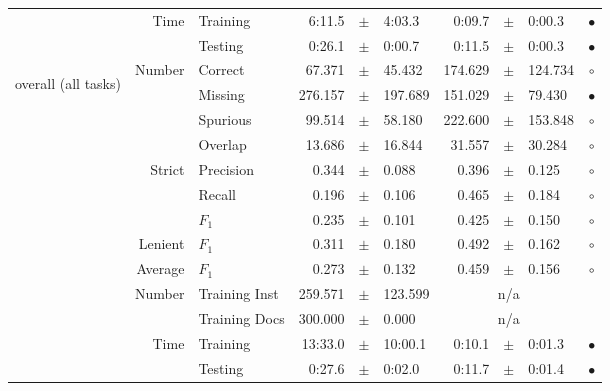 \begin{longtable}{|r|r|l||rcl|rcl|c|}
\cline{2-10} & \multirow{2}{*}{      Time} &        Training &      6:11.5 &  $\pm$  &      4:03.3 &      0:09.7 &  $\pm$  &      0:00.3 & $\bullet$ \\
\cline{3-10} &                             &         Testing &      0:26.1 &  $\pm$  &      0:00.7 &      0:11.5 &  $\pm$  &      0:00.3 & $\bullet$ \\
\hline
\hline
\multirow{11}{*}{\begin{sideways}overall (all tasks)\end{sideways} }
             & \multirow{4}{*}{    Number} &         Correct &      67.371 &  $\pm$  &      45.432 &     174.629 &  $\pm$  &     124.734 & $\circ$ \\
\cline{3-10} &                             &         Missing &     276.157 &  $\pm$  &     197.689 &     151.029 &  $\pm$  &      79.430 & $\bullet$ \\
\cline{3-10} &                             &        Spurious &      99.514 &  $\pm$  &      58.180 &     222.600 &  $\pm$  &     153.848 & $\circ$ \\
\cline{3-10} &                             &         Overlap &      13.686 &  $\pm$  &      16.844 &      31.557 &  $\pm$  &      30.284 & $\circ$ \\
\cline{2-10} & \multirow{3}{*}{    Strict} &       Precision &       0.344 &  $\pm$  &       0.088 &       0.396 &  $\pm$  &       0.125 & $\circ$ \\
\cline{3-10} &                             &          Recall &       0.196 &  $\pm$  &       0.106 &       0.465 &  $\pm$  &       0.184 & $\circ$ \\
\cline{3-10} &                             &           $F_1$ &       0.235 &  $\pm$  &       0.101 &       0.425 &  $\pm$  &       0.150 & $\circ$ \\
\cline{2-10} &                     Lenient &           $F_1$ &       0.311 &  $\pm$  &       0.180 &       0.492 &  $\pm$  &       0.162 & $\circ$ \\
\cline{2-10} &                     Average &           $F_1$ &       0.273 &  $\pm$  &       0.132 &       0.459 &  $\pm$  &       0.156 & $\circ$ \\
\cline{2-10} & \multirow{2}{*}{    Number} &   Training Inst &     259.571 &  $\pm$  &     123.599 &    \multicolumn{3}{c|}{n/a}         &  \\
\cline{3-10} &                             &   Training Docs &     300.000 &  $\pm$  &       0.000 &    \multicolumn{3}{c|}{n/a}         &  \\
\cline{2-10} & \multirow{2}{*}{      Time} &        Training &     13:33.0 &  $\pm$  &     10:00.1 &      0:10.1 &  $\pm$  &      0:01.3 & $\bullet$ \\
\cline{3-10} &                             &         Testing &      0:27.6 &  $\pm$  &      0:02.0 &      0:11.7 &  $\pm$  &      0:01.4 & $\bullet$ \\
\hline
\end{longtable}

